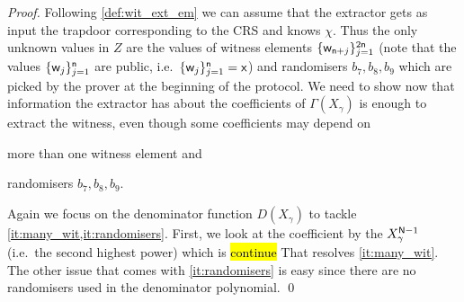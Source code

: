 \documentclass[runningheads,11pt]{llncs}
\theoremstyle{definition}
\begin{document}
\begin{proof}
Following \cref{def:wit_ext_em} we can assume that the extractor gets as input the trapdoor corresponding to the CRS and knows $\chi$.
Thus the only unknown values in $Z$ are the values of witness elements $\{\mathsf{w}_{\mathsf{n} + j}\}_{j = 1}^{2 \mathsf{n}}$ (note that the values $\{\mathsf{w}_{j}\}_{j = 1}^{\mathsf{n}}$ are public, i.e.~$\{\mathsf{w}_{j}\}_{j = 1}^{\mathsf{n}} = \mathsf{x}$) and randomisers $b_7, b_8, b_9$ which are picked by the prover at the beginning of the protocol.
We need to show now that information the extractor has about the coefficients of $\Gamma(X_\gamma)$ is enough to extract the witness, even though some coefficients may depend on
\begin{inparaenum}[(i)]
	\item more than one witness element and\label{it:many_wit}
	\item randomisers $b_7, b_8, b_9$.\label{it:randomisers}
\end{inparaenum}
%
Again we focus on the denominator function $D(X_\gamma)$ to tackle \cref{it:many_wit,it:randomisers}.
First, we look at the coefficient by the $X_\gamma^{\mathsf{N} - 1}$ (i.e.~the second highest power) which is  \hl{continue}
That resolves \cref{it:many_wit}. The other issue that comes with \cref{it:randomisers} is easy since there are no randomisers used in the denominator polynomial.
\qed
\end{proof}
\end{document}

